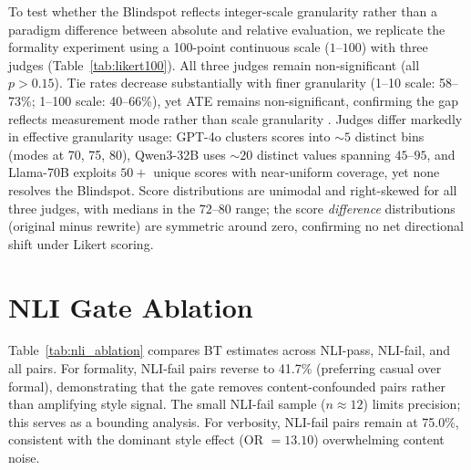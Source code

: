To test whether the Blindspot reflects integer-scale granularity rather than a paradigm difference between absolute and relative evaluation, we replicate the formality experiment using a 100-point continuous scale ($1$--$100$) with three judges (Table~\ref{tab:likert100}).
All three judges remain non-significant (all $p > 0.15$).
Tie rates decrease substantially with finer granularity (1--10 scale: 58--73\%; 1--100 scale: 40--66\%), yet ATE remains non-significant, confirming the gap reflects measurement mode rather than scale granularity \citep{preston2000scale}.
Judges differ markedly in effective granularity usage: GPT-4o clusters scores into ${\sim}5$ distinct bins (modes at 70, 75, 80), Qwen3-32B uses ${\sim}20$ distinct values spanning $45$--$95$, and Llama-70B exploits $50{+}$ unique scores with near-uniform coverage, yet none resolves the Blindspot.
Score distributions are unimodal and right-skewed for all three judges, with medians in the $72$--$80$ range; the score \emph{difference} distributions (original minus rewrite) are symmetric around zero, confirming no net directional shift under Likert scoring.

\begin{table}[h]
\centering
\small
\caption{Formality Likert ATE: 1--10 vs.\ 1--100 scale. Finer granularity reduces tie rates but does not resolve the Blindspot (all 1--100 $p > 0.15$).}
\label{tab:likert100}
\end{table}

\section{NLI Gate Ablation}
\label{app:nli_ablation}

Table~\ref{tab:nli_ablation} compares BT estimates across NLI-pass, NLI-fail, and all pairs.
For formality, NLI-fail pairs reverse to 41.7\% (preferring casual over formal), demonstrating that the gate removes content-confounded pairs rather than amplifying style signal.
The small NLI-fail sample ($n \approx 12$) limits precision; this serves as a bounding analysis.
For verbosity, NLI-fail pairs remain at 75.0\%, consistent with the dominant style effect (OR $= 13.10$) overwhelming content noise.

